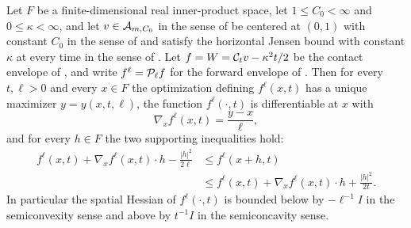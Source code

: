 \begin{lemma}
Let $F$ be a finite-dimensional real inner-product space, let
$1\le C_0<\infty$ and $0\le\kappa<\infty$, and let $v\in\mathcal{A}_{m,C_0}$ in the
sense of  be centered at $(0,1)$ with constant $C_0$ in the
sense of  and satisfy the horizontal Jensen bound with
constant $\kappa$ at every time in the sense of . Let
$f=W=\mathcal{C}_tv-\kappa^2t/2$ be the contact envelope of , and
write $f^\ell=\mathcal{P}_\ell f$ for the forward envelope of . Then
for every $t,\ell>0$ and every $x\in F$ the optimization defining
$f^\ell(x,t)$ has a unique maximizer $y=y(x,t,\ell)$, the function
$f^\ell(\cdot,t)$ is differentiable at $x$ with
\begin{equation}\label{eq:dp-gradient}
  \nabla_x f^\ell(x,t)=\frac{y-x}{\ell},
\end{equation}
and for every $h\in F$ the two supporting inequalities hold:
\begin{equation}\label{eq:dp-supports}
\begin{split}
  f^\ell(x,t)+\nabla_x f^\ell(x,t)\cdot h-\frac{|h|^2}{2\ell}
  &\le f^\ell(x+h,t)\\
  &\le f^\ell(x,t)+\nabla_x f^\ell(x,t)\cdot h+\frac{|h|^2}{2t}.
\end{split}
\end{equation}
In particular the spatial Hessian of $f^\ell(\cdot,t)$ is bounded below by
$-\ell^{-1}I$ in the semiconvexity sense and above by $t^{-1}I$ in the
semiconcavity sense.
\end{lemma}
